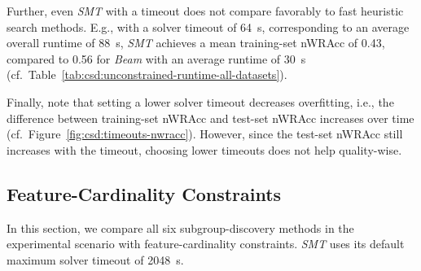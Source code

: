 \documentclass{article}
\theoremstyle{definition}
\begin{document}
Further, even \emph{SMT} with a timeout does not compare favorably to fast heuristic search methods.
E.g., with a solver timeout of 64~s, corresponding to an average overall runtime of 88~s, \emph{SMT} achieves a mean training-set nWRAcc of 0.43, compared to 0.56 for \emph{Beam} with an average runtime of 30~s (cf.~Table~\ref{tab:csd:unconstrained-runtime-all-datasets}).

Finally, note that setting a lower solver timeout decreases overfitting, i.e., the difference between training-set nWRAcc and test-set nWRAcc increases over time (cf.~Figure~\ref{fig:csd:timeouts-nwracc}).
However, since the test-set nWRAcc still increases with the timeout, choosing lower timeouts does not help quality-wise.

\subsection{Feature-Cardinality Constraints}
\label{sec:csd:evaluation:cardinality}

In this section, we compare all six subgroup-discovery methods in the experimental scenario with feature-cardinality constraints.
\emph{SMT} uses its default maximum solver timeout of 2048~s.
\end{document}
